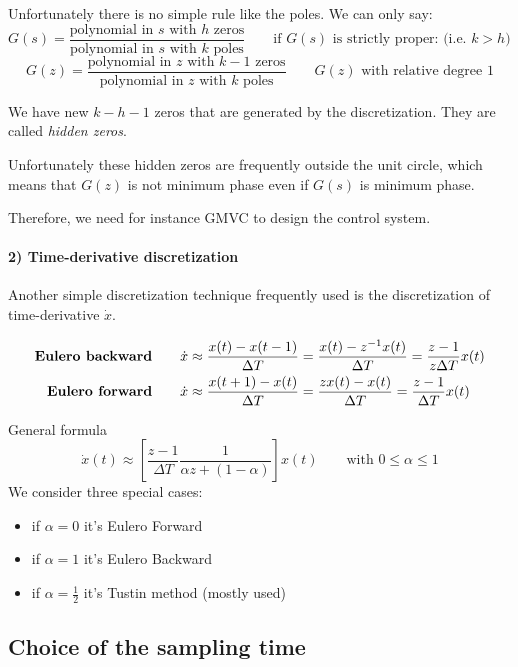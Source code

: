 \begin{appendices}
\begin{recall}[$s$-domain]
    Unfortunately there is no simple rule like the poles. We can only say:
    \[
        G(s) = \frac{\text{polynomial in $s$ with $h$ zeros}}{\text{polynomial in $s$ with $k$ poles}} \qquad \text{if $G(s)$ is strictly proper:  (i.e. $k > h$) }
    \]
    \[
        G(z) = \frac{\text{polynomial in $z$ with $k-1$ zeros}}{\text{polynomial in $z$ with $k$ poles}} \qquad \text{$G(z)$ with relative degree 1}
    \]

    We have new $k-h-1$ zeros that are generated by the discretization.
    They are called \emph{hidden zeros}.

    Unfortunately these hidden zeros are frequently outside the unit circle, which means that $G(z)$ is not minimum phase even if $G(s)$ is minimum phase.

    Therefore, we need for instance GMVC to design the control system.
\end{recall}

\paragraph{2) Time-derivative discretization}

Another simple discretization technique frequently used is the discretization of time-derivative $\dot{x}$.

\begin{align*}
    \text{\textbf{Eulero backward}} &\qquad \dot{x} \approx \frac{x(t)-x(t-1)}{\Delta T} = \frac{x(t)-z^{-1}x(t)}{\Delta T} = \frac{z-1}{z\Delta T} x(t) \\
    \text{\textbf{Eulero forward}} &\qquad \dot{x} \approx \frac{x(t+1)-x(t)}{\Delta T} = \frac{zx(t)-x(t)}{\Delta T} = \frac{z-1}{\Delta T} x(t)
\end{align*}

General formula
\[
    \dot{x}(t) \approx \left[ \frac{z-1}{\Delta T} \frac{1}{\alpha z + (1-\alpha)} \right]x(t) \qquad \text{with } 0 \le \alpha \le 1
\]
We consider three special cases:
\begin{itemize}
    \item if $\alpha = 0$ it's Eulero Forward
    \item if $\alpha = 1$ it's Eulero Backward
    \item if $\alpha = \frac{1}{2}$ it's Tustin method (mostly used)
\end{itemize}

\subsection*{Choice of the sampling time}


\end{appendices}
